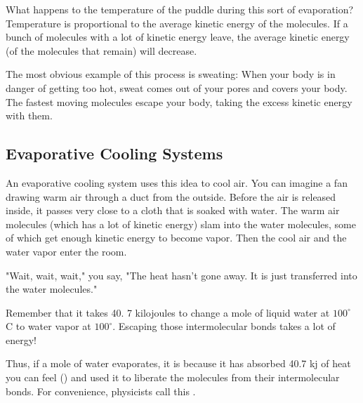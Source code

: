 What happens to the temperature of the puddle during this sort of evaporation?  Temperature is proportional to the average kinetic energy of the molecules.  If a bunch of molecules with a lot of kinetic energy leave,  the average kinetic energy (of the molecules that remain) will decrease.

The most obvious example of this process is sweating:  When your body is in danger of getting too hot,  sweat comes out of your pores and covers your body.   The fastest moving molecules escape your body,  taking the excess kinetic energy with them.

\subsection{Evaporative Cooling Systems}

An evaporative cooling system uses this idea to cool air.  You can imagine a fan drawing warm air through a duct from the outside.   Before the air is released inside,  it passes very close to a cloth that is soaked with water.   The warm air molecules (which has a lot of kinetic energy) slam into the water molecules,  some of which get enough kinetic energy to become vapor.  Then the cool air and the water vapor enter the room.

"Wait, wait, wait," you say, "The heat hasn't gone away.  It is just transferred into the water molecules."

Remember that it takes 40. 7 kilojoules to change a mole of liquid water at $100^\circ$ C to water vapor at $100^\circ$.  Escaping those intermolecular bonds takes a lot of energy!

Thus,   if a mole of water evaporates,   it is because it has absorbed 40.7 kj of heat you can feel
 () and used it to liberate the molecules from their intermolecular bonds.  For
 convenience,  physicists call this .